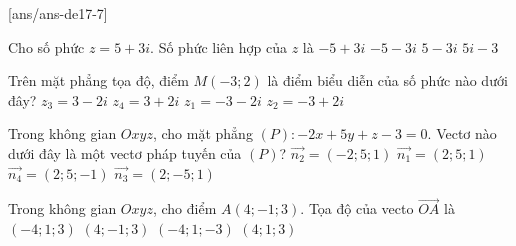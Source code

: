 
\begin{name}
	{\tenchude}
	{\tendethi}
	{\tentruong}
	{\thoigian}
\end{name}
[ans/ans-de17-7]

\begin{ex}%
Cho số phức $z=5+3 i$. Số phức liên hợp của $z$ là
\choice
{$-5+3 i$}
{$-5-3 i$}
{\True $5-3 i$}
{$5 i-3$}

\end{ex}
\begin{ex}%
Trên mặt phẳng tọa độ, điểm $M(-3; 2)$ là điểm biểu diễn của số phức nào dưới đây?
\choice
{$z_3=3-2 i$}
{$z_4=3+2 i$}
{$z_1=-3-2 i$}
{\True $z_2=-3+2 i$}

\end{ex}
\begin{ex}%
Trong không gian $O x y z$, cho mặt phẳng $(P)\colon-2 x+5 y+z-3=0$.
Vectơ nào dưới đây là một vectơ pháp tuyến của $(P)$?
\choice
{\True $\overrightarrow{n_2}=(-2; 5; 1)$}
{$\overrightarrow{n_1}=(2; 5; 1)$}
{$\overrightarrow{n_4}=(2; 5;-1)$}
{$\overrightarrow{n_3}=(2;-5; 1)$}

\end{ex}
\begin{ex}%
Trong không gian $O x y z$, cho điểm $A(4;-1; 3)$. Tọa độ của vecto $\overrightarrow{OA}$ là
\choice
{$(-4; 1; 3)$}
{\True $(4;-1; 3)$}
{$(-4; 1;-3)$}
{$(4; 1; 3)$}

\end{ex}
\begin{ex}%
{\vspace{-0.5cm}
}

\end{ex}
